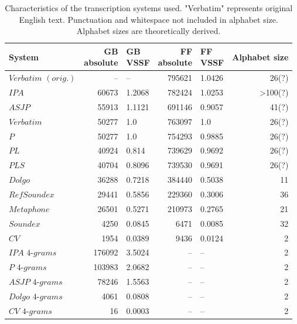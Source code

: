 \begin{table}
\caption{Characteristics of the transcription systems used. "Verbatim" represents original English text. Punctuation and whitespace not included in alphabet size. Alphabet sizes are theoretically derived.}
\label{tab:system_characteristics}
\centering\small
\begin{tabular}{@{}l@{\hspace{1\tabcolsep}}rlrlr@{}} %
\toprule
\bf System & \bf \specialcell{GB\\absolute} & \bf \specialcell{GB\\VSSF} & \bf \specialcell{FF\\absolute} & \bf \specialcell{FF\\VSSF} & \bf Alphabet size \\
\midrule
$Verbatim$ $(orig.)$ & -- & -- & 795621 & 1.0426 & 26(?) \\
$IPA$ & 60673 & 1.2068 & 782424 & 1.0253 & >100(?) \\
$ASJP$ & 55913 & 1.1121 & 691146 & 0.9057 & 41(?) \\
$Verbatim$ & 50277 & 1.0 & 763097 & 1.0 & 26(?) \\
$P$ & 50277 & 1.0 & 754293 & 0.9885 & 26(?) \\
$PL$ & 40924 & 0.814 & 739629 & 0.9692 & 26(?) \\
$PLS$ & 40704 & 0.8096 & 739530 & 0.9691 & 26(?) \\
$Dolgo$ & 36288 & 0.7218 & 384440 & 0.5038 & 11 \\
$RefSoundex$ & 29441 & 0.5856 & 229360 & 0.3006 & 36 \\
$Metaphone$ & 26501 & 0.5271 & 210973 & 0.2765 & 21 \\
$Soundex$ & 4250 & 0.0845 & 6471 & 0.0085 & 32 \\
$CV$ & 1954 & 0.0389 & 9436 & 0.0124 & 2 \\
$IPA$ $4$-$grams$ & 176092 & 3.5024 & -- & -- & 2 \\
$P$ $4$-$grams$ & 103983 & 2.0682 & -- & -- & 2 \\
$ASJP$ $4$-$grams$ & 78246 & 1.5563 & -- & -- & 2 \\
$Dolgo$ $4$-$grams$ & 4061 & 0.0808 & -- & -- & 2 \\
$CV$ $4$-$grams$ & 16 & 0.0003 & -- & -- & 2 \\
\bottomrule
\end{tabular}
\end{table}






